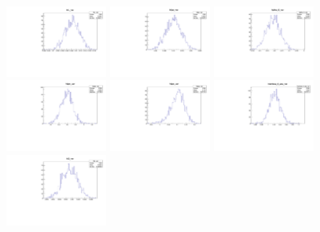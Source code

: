 \begin{figure}[tb]
   \begin{center}
	\includegraphics[width=0.3\textwidth]{figs/DataVars/fL_var.pdf}
	\includegraphics[width=0.3\textwidth]{figs/DataVars/fpe_var.pdf}
	\includegraphics[width=0.3\textwidth]{figs/DataVars/phis_0_var.pdf}
	\includegraphics[width=0.3\textwidth]{figs/DataVars/dpe_var.pdf}
	\includegraphics[width=0.3\textwidth]{figs/DataVars/dpa_var.pdf}
	\includegraphics[width=0.3\textwidth]{figs/DataVars/lambda_0_abs_var.pdf}
	\includegraphics[width=0.3\textwidth]{figs/DataVars/G_var.pdf}

\end{center}
\end{figure}
